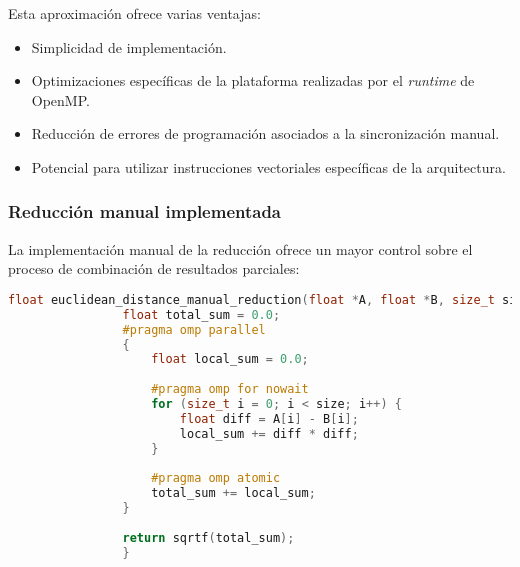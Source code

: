             Esta aproximación ofrece varias ventajas:
            
            \begin{itemize}
            
                \item Simplicidad de implementación.
                
                \item Optimizaciones específicas de la plataforma realizadas por el \textit{runtime} de OpenMP.
                
                \item Reducción de errores de programación asociados a la sincronización manual.
                
                \item Potencial para utilizar instrucciones vectoriales específicas de la arquitectura.
                
            \end{itemize}
            
        \subsubsection{Reducción manual implementada}

            La implementación manual de la reducción ofrece un mayor control sobre el proceso de combinación de resultados parciales:
            
            \begin{lstlisting}[language=c, caption={Reducción manual implementada con operaciones atómicas.}, label=manual_reduction_code, gobble=16]
                float euclidean_distance_manual_reduction(float *A, float *B, size_t size) {
                float total_sum = 0.0;
                #pragma omp parallel
                {
                    float local_sum = 0.0;
                
                    #pragma omp for nowait
                    for (size_t i = 0; i < size; i++) {
                        float diff = A[i] - B[i];
                        local_sum += diff * diff;
                    }
                
                    #pragma omp atomic
                    total_sum += local_sum;
                }
                
                return sqrtf(total_sum);
                }
            \end{lstlisting}
            
